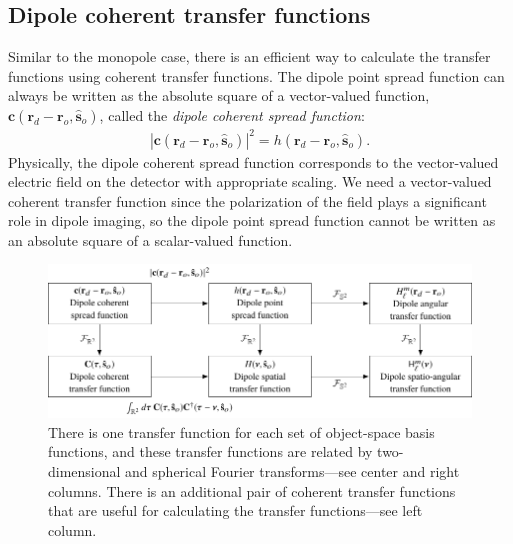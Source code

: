 \documentclass[]{osa-article}
\providecommand{\mb}[1]{\mathbf{#1}}
\providecommand{\ro}{\mathbf{\mathbf{r}}_o}
\providecommand{\so}{\mathbf{\hat{s}}_o}
\providecommand{\rd}{\mathbf{r}_d}
\begin{document}
\subsection{Dipole coherent transfer functions}
Similar to the monopole case, there is an efficient way to calculate the
transfer functions using coherent transfer functions. The dipole point spread
function can always be written as the absolute square of a vector-valued
function, $\mb{c}(\rd - \ro, \so)$, called the \textit{dipole coherent spread
  function}:
\begin{align}
  |\mb{c}(\rd - \ro, \so)|^2 = h(\rd - \ro, \so). \label{eq:absquare2}
\end{align}
Physically, the dipole coherent spread function corresponds to the vector-valued
electric field on the detector with appropriate scaling. We need a vector-valued
coherent transfer function since the polarization of the field plays a
significant role in dipole imaging, so the dipole point spread function cannot
be written as an absolute square of a scalar-valued function.

\begin{figure}
  \hspace{-2em}
  \includegraphics[scale=1.0]{../figures/transfer-functions/transfer-functions.pdf}
  \caption{There is one transfer function for each set of object-space basis
    functions, and these transfer functions are related by two-dimensional and
    spherical Fourier transforms---see center and right columns. There is an
    additional pair of coherent transfer functions that are useful for
    calculating the transfer functions---see left column.}
   \label{fig:transfer-functions}
 \end{figure}
    
\end{document}
